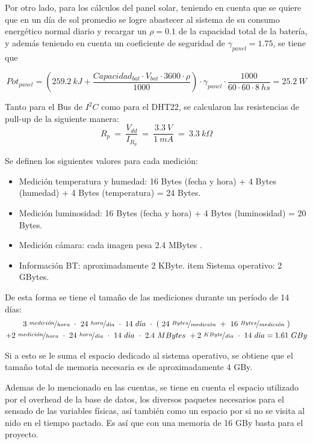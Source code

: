 Por otro lado, para los cálculos del panel solar, teniendo en cuenta que se quiere que en un día de sol promedio se logre abastecer al sistema de su consumo energético normal diario y recargar un $\rho = 0.1$ de la capacidad total de la batería, y además teniendo en cuenta un coeficiente de seguridad de $\gamma_{panel} = 1.75$, se tiene que

\begin{equation}
Pot_{panel} = \left( 259.2 \ kJ + \frac{Capacidad_{bat}\cdot V_{bat}\cdot 3600\cdot \rho}{1000}\right)\cdot \gamma_{panel} \cdot  \frac{1000}{60\cdot 60\cdot 8 \ hs} = 25.2 \ W
\end{equation}


Tanto para el Bus de $I^2C$ como para el DHT22, se calcularon las resistencias de pull-up de la siguiente manera:
\begin{equation}
	R_p \ = \  \frac{V_{dd}}{I_{R_p}} \ = \ \frac{3.3 \ V}{1 \ mA} \ = \ 3.3 \ k\Omega  
\end{equation}

Se definen los siguientes valores para cada medici\'on:
\begin{itemize}
	\item Medición temperatura y humedad: 16 Bytes (fecha y hora) + 4 Bytes (humedad) + 4 Bytes (temperatura) = 24 Bytes.
	\item Medición luminosidad: 16 Bytes (fecha y hora) + 4 Bytes (luminosidad) = 20 Bytes.
	\item Medición cámara: cada imagen pesa 2.4 MBytes \cite{ref:rpicam}.
	\item Información BT: aproximadamente 2 KByte.
	item Sistema operativo: 2 GBytes.
\end{itemize}

De esta forma se tiene el tamaño de las mediciones durante un período de 14 días:
\begin{multline*}
	3 \ \nicefrac{medici\acute{o}n}{hora} \  \cdot \ 24 \ \nicefrac{hora}{d\acute{\imath}a} \  \cdot \ 14 \ d\acute{\imath}a \  \cdot \ ( \ 24 \  \nicefrac{Bytes}{medici\acute{o}n} \  + \ 16 \ \nicefrac{Bytes}{medici\acute{o}n} \ ) \\ + 2 \ \nicefrac{medici\acute{o}n}{hora} \  \cdot \ 24 \ \nicefrac{hora}{d\acute{\imath}a} \  \cdot \ 14 \ d\acute{\imath}a \  \cdot \  2.4 \ MBytes \ + 2 \ \nicefrac{KByte}{d\acute{\imath}a} \  \cdot \  14 \ d\acute{\imath}a = 1.61 \ GBy
\end{multline*}

Si a esto se le suma el espacio dedicado al sistema operativo, se obtiene que el tamaño total de memoria necesaria es de aproximadamente 4 GBy.

Ademas de lo mencionado en las cuentas, se tiene en cuenta el espacio utilizado por el overhead de la base de datos, los diversos paquetes necesarios para el sensado de las variables físicas, así también como un espacio por si no se visita al nido en el tiempo pactado. Es así que con una memoria de 16 GBy basta para el proyecto.